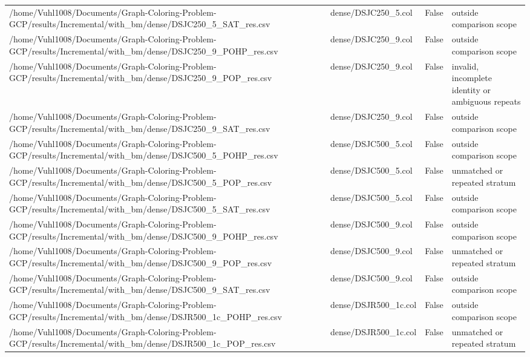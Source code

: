 \begin{table}[htbp]
\begin{tabular}{llll}
/home/Vuhl1008/Documents/Graph-Coloring-Problem-GCP/results/Incremental/with\_bm/dense/DSJC250\_5\_SAT\_res.csv & dense/DSJC250\_5.col & False & outside comparison scope \\
/home/Vuhl1008/Documents/Graph-Coloring-Problem-GCP/results/Incremental/with\_bm/dense/DSJC250\_9\_POHP\_res.csv & dense/DSJC250\_9.col & False & outside comparison scope \\
/home/Vuhl1008/Documents/Graph-Coloring-Problem-GCP/results/Incremental/with\_bm/dense/DSJC250\_9\_POP\_res.csv & dense/DSJC250\_9.col & False & invalid, incomplete identity or ambiguous repeats \\
/home/Vuhl1008/Documents/Graph-Coloring-Problem-GCP/results/Incremental/with\_bm/dense/DSJC250\_9\_SAT\_res.csv & dense/DSJC250\_9.col & False & outside comparison scope \\
/home/Vuhl1008/Documents/Graph-Coloring-Problem-GCP/results/Incremental/with\_bm/dense/DSJC500\_5\_POHP\_res.csv & dense/DSJC500\_5.col & False & outside comparison scope \\
/home/Vuhl1008/Documents/Graph-Coloring-Problem-GCP/results/Incremental/with\_bm/dense/DSJC500\_5\_POP\_res.csv & dense/DSJC500\_5.col & False & unmatched or repeated stratum \\
/home/Vuhl1008/Documents/Graph-Coloring-Problem-GCP/results/Incremental/with\_bm/dense/DSJC500\_5\_SAT\_res.csv & dense/DSJC500\_5.col & False & outside comparison scope \\
/home/Vuhl1008/Documents/Graph-Coloring-Problem-GCP/results/Incremental/with\_bm/dense/DSJC500\_9\_POHP\_res.csv & dense/DSJC500\_9.col & False & outside comparison scope \\
/home/Vuhl1008/Documents/Graph-Coloring-Problem-GCP/results/Incremental/with\_bm/dense/DSJC500\_9\_POP\_res.csv & dense/DSJC500\_9.col & False & unmatched or repeated stratum \\
/home/Vuhl1008/Documents/Graph-Coloring-Problem-GCP/results/Incremental/with\_bm/dense/DSJC500\_9\_SAT\_res.csv & dense/DSJC500\_9.col & False & outside comparison scope \\
/home/Vuhl1008/Documents/Graph-Coloring-Problem-GCP/results/Incremental/with\_bm/dense/DSJR500\_1c\_POHP\_res.csv & dense/DSJR500\_1c.col & False & outside comparison scope \\
/home/Vuhl1008/Documents/Graph-Coloring-Problem-GCP/results/Incremental/with\_bm/dense/DSJR500\_1c\_POP\_res.csv & dense/DSJR500\_1c.col & False & unmatched or repeated stratum \\

\end{tabular}
\end{table}
